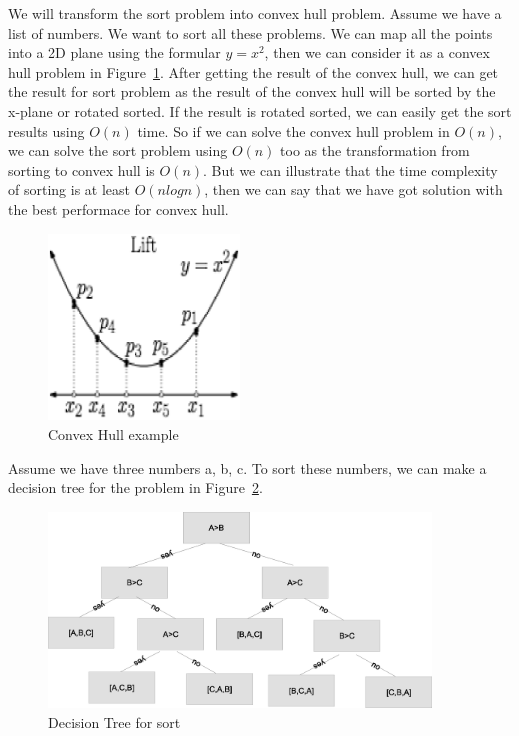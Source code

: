 \documentclass[usletter]{article}
\begin{document}
We will transform the sort problem into convex hull problem. Assume we have a list of numbers. We want to sort all these problems. We can map all the points into a 2D plane using the formular $y=x^2$, then we can consider it as a convex hull problem in Figure~\ref{fig:convex-hull}.  After getting the result of the convex hull, we can get the result for sort problem as the result of the convex hull will be sorted by the x-plane or rotated sorted. If the result is rotated sorted, we can easily get the sort results using $O(n)$ time. So if we can solve the convex hull problem in $O(n)$, we can solve the sort problem using $O(n)$ too as the transformation from sorting to convex hull is $O(n)$.  But we can illustrate that the time complexity of sorting is at least $O(nlogn)$, then we can say that we have got solution with the best performace for convex hull.
\begin{figure}[bht]
\begin{center}
     \includegraphics[width=2.0in]{figures/convex-hull}
\caption{\label{fig:convex-hull}Convex Hull example}
\end{center}
\end{figure}

Assume we have three numbers a, b, c. To sort these numbers, we can make a decision tree for the problem in Figure~\ref{fig:decision-tree}.

\begin{figure}[bht]
\begin{center}
     \includegraphics[width=4.0in]{figures/decision-tree}
\caption{\label{fig:decision-tree}Decision Tree for sort}
\end{center}
\end{figure}
\end{document}
